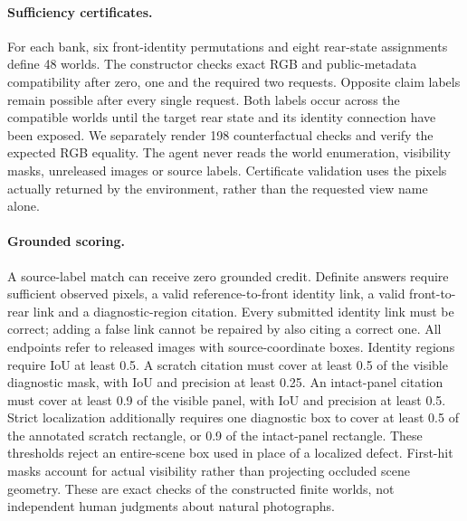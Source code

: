 \paragraph{Sufficiency certificates.}
For each bank, six front-identity permutations and eight rear-state assignments define 48 worlds.
The constructor checks exact RGB and public-metadata compatibility after zero, one and the required two requests.
Opposite claim labels remain possible after every single request.
Both labels occur across the compatible worlds until the target rear state and its identity connection have been exposed.
We separately render 198 counterfactual checks and verify the expected RGB equality.
The agent never reads the world enumeration, visibility masks, unreleased images or source labels.
Certificate validation uses the pixels actually returned by the environment, rather than the requested view name alone.

\paragraph{Grounded scoring.}
A source-label match can receive zero grounded credit.
Definite answers require sufficient observed pixels, a valid reference-to-front identity link, a valid front-to-rear link and a diagnostic-region citation.
Every submitted identity link must be correct; adding a false link cannot be repaired by also citing a correct one.
All endpoints refer to released images with source-coordinate boxes.
Identity regions require IoU at least 0.5.
A scratch citation must cover at least 0.5 of the visible diagnostic mask, with IoU and precision at least 0.25.
An intact-panel citation must cover at least 0.9 of the visible panel, with IoU and precision at least 0.5.
Strict localization additionally requires one diagnostic box to cover at least 0.5 of the annotated scratch rectangle, or 0.9 of the intact-panel rectangle.
These thresholds reject an entire-scene box used in place of a localized defect.
First-hit masks account for actual visibility rather than projecting occluded scene geometry.
These are exact checks of the constructed finite worlds, not independent human judgments about natural photographs.


